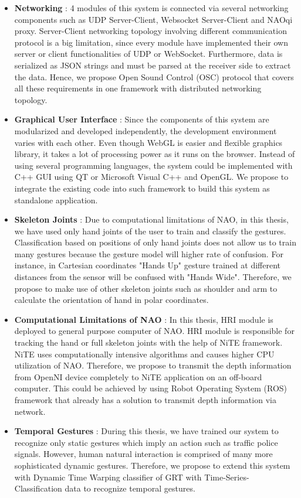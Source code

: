 \begin{itemize}
		\item \textbf{Networking} : 4 modules of this system is connected via several networking components such as UDP Server-Client, Websocket Server-Client and NAOqi proxy. Server-Client networking topology involving different communication protocol is a big limitation, since every module have implemented their own server or client functionalities of UDP or WebSocket. Furthermore, data is serialized as JSON strings and must be parsed at the receiver side to extract the data. Hence, we propose Open Sound Control (OSC) protocol that covers all these requirements in one framework with distributed networking topology.
		
		\item \textbf{Graphical User Interface} : Since the components of this system are modularized and developed independently, the development environment varies with each other. Even though WebGL is easier and flexible graphics library, it takes a lot of processing power as it runs on the browser. Instead of using several programming languages, the system could be implemented with C++ GUI using QT or Microsoft Visual C++ and OpenGL. We propose to integrate the existing code into such framework to build this system as standalone application. 
		
		\item \textbf{Skeleton Joints} :  Due to computational limitations of NAO, in this thesis, we have used only hand joints of the user to train and classify the gestures. Classification based on positions of only hand joints does not allow us to train many gestures because the gesture model will higher rate of confusion. For instance, in Cartesian coordinates "Hands Up" gesture trained at different distances from the sensor will be confused with "Hands Wide". Therefore, we propose to make use of other skeleton joints such as shoulder and arm to calculate the orientation of hand in polar coordinates.
		
		\item \textbf{Computational Limitations of NAO} : In this thesis, HRI module is deployed to general purpose computer of NAO. HRI module is responsible for tracking the hand or full skeleton joints with the help of NiTE framework. NiTE uses computationally intensive algorithms and causes higher CPU utilization of NAO. Therefore, we propose to transmit the depth information from OpenNI device completely to NiTE application on an off-board computer. This could be achieved by using Robot Operating System (ROS) framework that already has a solution to transmit depth information via network.
		
		\item \textbf{Temporal Gestures} : During this thesis, we have trained our system to recognize only static gestures which imply an action such as traffic police signals. However, human natural interaction is comprised of many more sophisticated dynamic gestures. Therefore, we propose to extend this system with Dynamic Time Warping classifier of GRT with Time-Series-Classification data to recognize temporal gestures. 
		
\end{itemize}